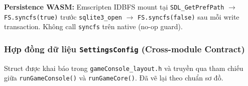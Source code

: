 \documentclass[12pt,a4paper]{article}
\begin{document}
\vspace{4pt}
\noindent\textbf{Persistence WASM:} Emscripten IDBFS mount tại \texttt{SDL\_GetPrefPath} $\rightarrow$ \texttt{FS.syncfs(true)} trước \texttt{sqlite3\_open} $\rightarrow$ \texttt{FS.syncfs(false)} sau mỗi write transaction. Không call \texttt{syncfs} trên native (no-op guard).

\subsubsection{Hợp đồng dữ liệu \texttt{SettingsConfig} (Cross-module Contract)}

\noindent Struct được khai báo trong \texttt{gameConsole\_layout.h} và truyền qua tham chiếu giữa \texttt{runGameConsole()} và \texttt{runGameCore()}. Đã vẽ lại theo chuẩn sơ đồ.
\end{document}
